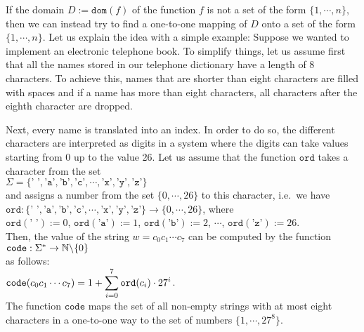 If the domain $D := \texttt{dom}(f)$ of the function $f$ is not a set of the form $\{1, \cdots, n\}$, 
then we can instead try to find a one-to-one mapping of $D$ onto a set of the form $\{1,\cdots,n\}$.
Let us explain the idea with a simple example:  Suppose we wanted to implement an electronic 
telephone book.
To simplify things, let us assume first that all the names stored in our telephone dictionary
have a length of 8 characters.  To achieve this, names that are shorter than eight characters
are filled with spaces and if a name has more than eight characters, all characters after the
eighth character are dropped.

Next, every name is translated into an index.  In order to do so, the different
characters are interpreted as digits in a system where the digits can take values starting
from 0 up to the value 26.
Let us assume that the function  $\texttt{ord}$ takes a character from the set
\\[0.2cm]
\hspace*{1.3cm}
$\Sigma = \{ \texttt{' '}, \texttt{'a'}, \texttt{'b'}, \texttt{'c'}, \cdots, \texttt{'x'}, \texttt{'y'}, \texttt{'z'} \}$ 
\\[0.2cm]
and assigns a number from the set $\{0,\cdots,26\}$ to this character, i.e.~we have \\[0.2cm]
\hspace*{1.3cm} 
$\texttt{ord}: \{ \texttt{' '}, \texttt{'a'}, \texttt{'b'}, \texttt{'c'}, \cdots, \texttt{'x'}, \texttt{'y'},
\texttt{'z'} \} \rightarrow \{0,\cdots, 26\}$, \quad where
\\[0.2cm]
\hspace*{1.3cm}
$\texttt{ord}(\texttt{' '}) := 0$, \quad
$\texttt{ord}(\texttt{'a'}) := 1$, \quad
$\texttt{ord}(\texttt{'b'}) := 2$, \quad $\cdots$, \quad
$\texttt{ord}(\texttt{'z'}) := 26$.
\\[0.2cm]
Then, the value of the string  $w = c_0c_1\cdots c_7$ can be computed by the function \\[0.2cm]
\hspace*{1.3cm} 
$\texttt{code}: \Sigma^* \rightarrow \mathbb{N} \symbol{92} \{ 0 \}$ \\[0.2cm]
as follows: \\[0.2cm]
\hspace*{1.3cm} 
$\displaystyle \texttt{code}(c_0c_1\cdots c_7) = 1 + \sum\limits_{i=0}^7 \texttt{ord}(c_i) \cdot 27^i$.
\\[0.2cm]
The function $\texttt{code}$ maps the set of all non-empty strings with at most eight characters in a
one-to-one way to the set of numbers $\{1,\cdots,27^8\}$.


